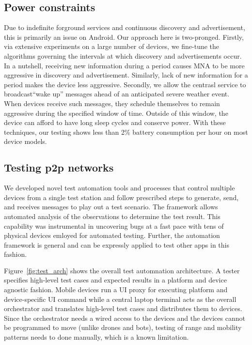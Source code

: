 \documentclass[conference]{IEEEtran}
\begin{document}
%
\subsection{Power constraints}
\label{sec:power}
%
Due to indefinite forground services and continuous discovery and
advertisement, this is primarily an issue on Android. Our approach
here is two-pronged. Firstly, via extensive experiments on a large
number of devices, we fine-tune the algorithms governing the intervals
at which discovery and advertisements occur. In a nutshell, receiving
new information during a period causes MNA to be more aggressive in
discovery and advertisement. Similarly, lack of new information for a
period makes the device less aggressive. Secondly, we allow the
centrasl service to broadcast``wake up'' messages ahead of an
anticipated severe weather event.  When devices receive such messages,
they schedule themselves to remain aggressive during the specified
window of time.  Outside of this window, the device can afford to have
long sleep cycles and conserve power. With these techniques, our
testing shows less than 2\% battery consumption per hour on most
device models.
%
\subsection{Testing p2p networks}
\label{sec:texting}
%
We developed novel test automation tools and processes that control
multiple devices from a single test station and follow prescribed
steps to generate, send, and receives messages to play out a test
scenario.  The framework allows automated analysis of the observations
to determine the test result. This capability was instrumental in
uncovering bugs at a fast pace with tens of physical devices emloyed
for automated testing.  Further, the automation framework is general
and can be expressly applied to test other apps in this fashion.

Figure~\ref{fig:test_arch} shows the overall test automnation
architecture. A tester specifies high-level test cases and expected
results in a platform and device agnostic fashion. Mobile devices run
a UI proxy for executing platform and device-specific UI command while
a central laptop terminal acts as the overall orchestrator and
translates high-level test cases and distributes them to
devices. Since the orchestrator needs a wired access to the devices
and the devices cannot be programmed to move (unlike drones and bots),
testing of range and mobility patterns needs to done manually, which
is a known limitation.
\end{document}
